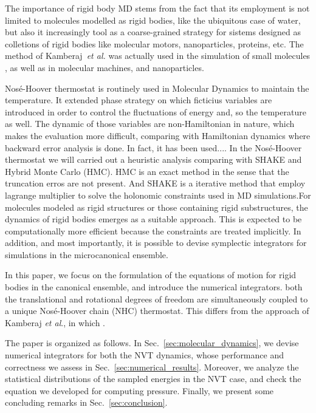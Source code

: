 \documentclass[aip,jcp,reprint,amsmath,amssymb]{revtex4-1}
\begin{document}
The importance of rigid body MD stems from the fact that its employment is not limited to molecules modelled as rigid bodies, like the ubiquitous case of water,  but also it increasingly tool as a coarse-grained strategy for sistems designed as colletions of rigid bodies like molecular motors, nanoparticles, proteins, etc. The method of Kamberaj~\textit{et al.}\cite{Kamberaj2005} was actually used in the simulation of small molecules\cite{Yan_2008,Akimov_2012,Geiger_2013} \cite{Aimoli_2014}, as well as in molecular machines,\cite{Akimov2008, Konyukhov2010} and nanoparticles.\cite{Knorowski2012, Patra2013}

Nos\'{e}-Hoover thermostat is routinely used in Molecular Dynamics to maintain the temperature. It extended phase strategy on which ficticius variables are introduced in order to control the fluctuations of energy and, so the temperature as well. The dynamic of those variables are non-Hamiltonian in nature, which makes the evaluation more difficult, comparing with Hamiltonian dynamics where backward error analysis is done. In fact, it has been used.... In the Nos\'{e}-Hoover thermostat we will carried out a heuristic analysis comparing with SHAKE and Hybrid Monte Carlo (HMC).\cite{Duane1987}  HMC is an exact method in the sense that the truncation erros are not present. And SHAKE is a iterative method that employ lagrange multiplier to solve the holonomic constraints used in MD simulations.For molecules modeled as rigid structures or those containing rigid substructures,\cite{Miller2002} the dynamics of rigid bodies emerges as a suitable approach. This is expected to be computationally more efficient because the constraints are treated implicitly. In addition, and most importantly, it is possible to devise symplectic integrators for simulations in the microcanonical ensemble.

In this paper, we focus on the formulation of the equations of motion for rigid bodies in the canonical ensemble, and introduce the numerical integrators. both the translational and rotational degrees of freedom are simultaneously coupled to a unique Nos\'e-Hoover chain (NHC) thermostat. This differs from the approach of Kamberaj \textit{et al}.,\cite{Kamberaj2005} in which . 

The paper is organized as follows. In Sec.~\ref{sec:molecular_dynamics}, we devise numerical integrators for both the NVT dynamics, whose performance and correctness we assess in Sec.~\ref{sec:numerical_results}. Moreover, we analyze the statistical distributions of the sampled energies in the NVT case, and check the equation we developed for computing pressure. Finally, we present some concluding remarks in Sec.~\ref{sec:conclusion}.
\end{document}
